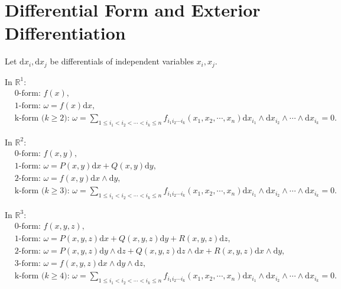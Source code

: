 \documentclass[11pt]{../../TexTemplate/elegantbook}
\begin{document}
\section{Differential Form and Exterior Differentiation}
Let \(\mathrm{d}x_{i}, \mathrm{d}x_{j}\) be differentials of independent variables \(x_{i}, x_{j}\).

In \(\mathbb{R}^{1}\):
\begin{align*}
    &\text{0-form: } f(x), \\
    &\text{1-form: } \omega = f(x)\mathrm{d}x, \\
    &\text{k-form (\(k\geqslant 2\)): } \omega = \sum_{1 \leqslant i_{1} < i_{2} < \cdots < i_{k} \leqslant n}
        f_{i_{1} i_{2} \cdots i_{k}}(x_{1}, x_{2}, \cdots, x_{n})
        \mathrm{d}x_{i_{1}} \wedge \mathrm{d}x_{i_{2}} \wedge \cdots \wedge \mathrm{d}x_{i_{k}} = 0.
\end{align*}

In \(\mathbb{R}^{2}\):
\begin{align*}
    &\text{0-form: } f(x, y), \\
    &\text{1-form: } \omega = P(x, y)\mathrm{d}x + Q(x, y)\mathrm{d}y, \\
    &\text{2-form: } \omega = f(x, y)\mathrm{d}x \wedge \mathrm{d}y, \\
    &\text{k-form (\(k\geqslant 3\)): } \omega = \sum_{1 \leqslant i_{1} < i_{2} < \cdots < i_{k} \leqslant n}
        f_{i_{1} i_{2} \cdots i_{k}}(x_{1}, x_{2}, \cdots, x_{n})
        \mathrm{d}x_{i_{1}} \wedge \mathrm{d}x_{i_{2}} \wedge \cdots \wedge \mathrm{d}x_{i_{k}} = 0.
\end{align*}

In \(\mathbb{R}^{3}\):
\begin{align*}
    &\text{0-form: } f(x, y, z), \\
    &\text{1-form: } \omega = P(x, y, z)\mathrm{d}x + Q(x, y, z)\mathrm{d}y + R(x, y, z)\mathrm{d}z, \\
    &\text{2-form: } \omega = P(x, y, z)\mathrm{d}y \wedge \mathrm{d}z + Q(x, y, z)\mathrm{d}z \wedge \mathrm{d}x + R(x, y, z)\mathrm{d}x \wedge \mathrm{d}y, \\
    &\text{3-form: } \omega = f(x, y, z)\mathrm{d}x \wedge \mathrm{d}y \wedge \mathrm{d}z, \\
    &\text{k-form (\(k\geqslant 4\)): } \omega = \sum_{1 \leqslant i_{1} < i_{2} < \cdots < i_{k} \leqslant n}
        f_{i_{1} i_{2} \cdots i_{k}}(x_{1}, x_{2}, \cdots, x_{n})
        \mathrm{d}x_{i_{1}} \wedge \mathrm{d}x_{i_{2}} \wedge \cdots \wedge \mathrm{d}x_{i_{k}} = 0.
\end{align*}
\end{document}
